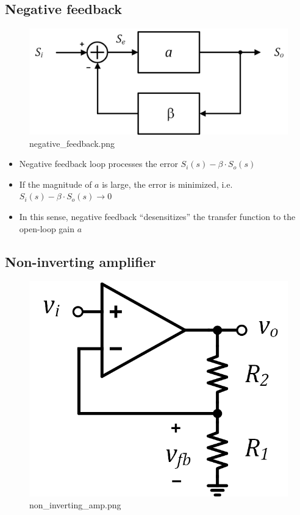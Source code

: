 \documentclass[11pt]{article}
\providecommand{\tightlist}{%
      \setlength{\itemsep}{0pt}\setlength{\parskip}{0pt}}
\begin{document}
    \hypertarget{negative-feedback}{%
\subsection{Negative feedback}\label{negative-feedback}}

    \begin{figure}
\centering
\includegraphics{negative_feedback.png}
\caption{negative\_feedback.png}
\end{figure}

    \begin{itemize}
\tightlist
\item
  Negative feedback loop processes the error
  \(S_i(s) -\beta \cdot S_o(s)\)
\item
  If the magnitude of \(a\) is large, the error is minimized,
  i.e.~\(S_i(s) - \beta \cdot S_o(s) \rightarrow 0\)
\item
  In this sense, negative feedback ``desensitizes'' the transfer
  function to the open-loop gain \(a\)
\end{itemize}

    \hypertarget{non-inverting-amplifier}{%
\subsection{Non-inverting amplifier}\label{non-inverting-amplifier}}

    \begin{figure}
\centering
\includegraphics{non_inverting_amp.png}
\caption{non\_inverting\_amp.png}
\end{figure}
\end{document}
